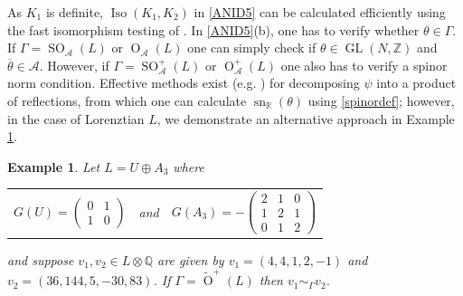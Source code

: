 \documentclass[12pt, a4paper]{article}
\newtheorem{example}[theorem]{Example}
\newcommand{\RR}{\mathbb{R}}
\newcommand{\ZZ}{\mathbb{Z}}
\newcommand{\QQ}{\mathbb{Q}}
\newcommand{\Ac}{\mathcal{A}}
\newcommand{\opn}{\operatorname}
\newcommand{\op}{\oplus}
\newcommand{\bpm}{\begin{pmatrix}}
\newcommand{\epm}{\end{pmatrix}}
\begin{document}
As $K_1$ is definite, $\opn{Iso}(K_1, K_2)$ in \ref{ANID5} can be calculated efficiently using the fast isomorphism testing of \cite{PleskenPohst, PleskenSouvignier}.
In \ref{ANID5}(b), one has to verify whether $\theta \in \Gamma$.
If $\Gamma=\opn{SO}_{\Ac}(L)$ or $\opn{O}_{\Ac}(L)$ one can simply check if $\theta \in \opn{GL}(N, \ZZ)$ and $\overline{\theta} \in \Ac$.
However, if $\Gamma =\opn{SO}^+_{\Ac}(L)$ or $\opn{O}^+_{\Ac}(L)$ one also has to verify a spinor norm condition.
Effective methods exist (e.g. \cite[p.18-20]{cassels}) for decomposing $\psi$ into a product of reflections, from which one can calculate  $\opn{sn}_{\RR}(\theta)$ using \eqref{spinordef}; however, in the case of Lorenztian $L$, we demonstrate an alternative approach in Example \ref{nonisoorbit}.
\begin{example}\label{nonisoorbit}
  Let $L=U \op A_3$ where
  \begin{center}
    \begin{tabular}{ccc}
    $G(U) = \bpm 0 & 1 \\ 1 & 0 \epm$
    & and &
      $G(A_3) = - \bpm 2 & 1 & 0 \\ 1 & 2 & 1 \\ 0 & 1 & 2 \epm$
    \end{tabular}
    \end{center}
  and suppose $v_1, v_2 \in L \otimes \QQ$
  are given by
  $v_1= (4,4,1,2,-1)$ and $v_2 = (36, 144, 5, -30, 83)$.
  If $\Gamma = \widetilde{\opn{O}}^+(L)$ then $v_1 \sim_{\Gamma} v_2$.
\end{example}
\end{document}
